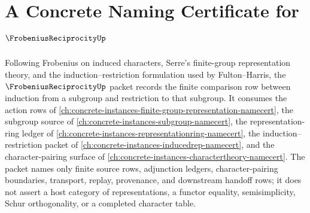 \chapter{A Concrete Naming Certificate for $\FrobeniusReciprocityUp$}
\label{ch:concrete-instances-frobenius-reciprocity-namecert}

Following Frobenius on induced characters, Serre's finite-group representation theory, and the induction--restriction formulation used by Fulton--Harris, the $\FrobeniusReciprocityUp$ packet records the finite comparison row between induction from a subgroup and restriction to that subgroup. It consumes the action rows of \autoref{ch:concrete-instances-finite-group-representation-namecert}, the subgroup source of \autoref{ch:concrete-instances-subgroup-namecert}, the representation-ring ledger of \autoref{ch:concrete-instances-representationring-namecert}, the induction--restriction packet of \autoref{ch:concrete-instances-inducedrep-namecert}, and the character-pairing surface of \autoref{ch:concrete-instances-charactertheory-namecert}. The packet names only finite source rows, adjunction ledgers, character-pairing boundaries, transport, replay, provenance, and downstream handoff rows; it does not assert a host category of representations, a functor equality, semisimplicity, Schur orthogonality, or a completed character table.

